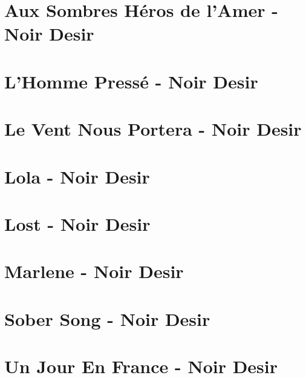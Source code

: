 \documentclass[11pt]{article}
\begin{document}
\section{Aux Sombres Héros de l'Amer - Noir Desir}
\begin{guitar}

\end{guitar}


\section{L'Homme Pressé - Noir Desir}
\begin{guitar}

\end{guitar}

\section{Le Vent Nous Portera - Noir Desir}
\begin{guitar}

\end{guitar}


\section*{Lola - Noir Desir}
\begin{guitar}

\end{guitar}




\section{Lost - Noir Desir}


\section{Marlene - Noir Desir}
\begin{guitar}

\end{guitar}

\section{Sober Song - Noir Desir}



\section*{Un Jour En France - Noir Desir}
\begin{guitar}

\end{guitar}
\end{document}
